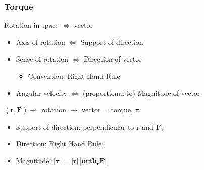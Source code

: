 \begin{frame}
 \frametitle{Torque}

  Rotation in space $\Longleftrightarrow$ vector\pause
  \begin{itemize}
   \item Axis of rotation $\Longleftrightarrow$ Support of direction \pause
   \item Sense of rotation  $\Longleftrightarrow$ Direction of vector \pause
  \begin{itemize}
      \item Convention: Right Hand Rule\pause
  \end{itemize}
  \item Angular velocity $\Longleftrightarrow$ (proportional to) Magnitude of vector\pause
  \end{itemize}
\begin{center}
 $(\textbf{r}, \textbf{F}) \rightarrow$ rotation $\rightarrow$ vector = torque, $\bm{\tau}$
\end{center}



\begin{itemize}
 \item Support of direction: perpendicular to $\textbf{r}$ and $\textbf{F}$;
 \item Direction: Right Hand Rule;
 \item Magnitude: $|\bm{\tau}| = |\textbf{r}| \, |\textbf{orth}_{\bm{r}} \textbf{F}|$
\end{itemize}

\end{frame}

